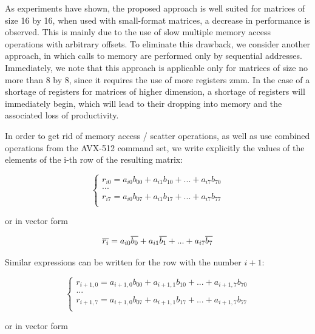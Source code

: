 \documentclass[
11pt,%
tightenlines,%
twoside,%
onecolumn,%
nofloats,%
nobibnotes,%
nofootinbib,%
superscriptaddress,%
noshowpacs,%
centertags]%
{revtex4}
\begin{document}
As experiments have shown, the proposed approach is well suited for matrices of size 16 by 16, when used with small-format matrices, a decrease in performance is observed. This is mainly due to the use of slow multiple memory access operations with arbitrary offsets. To eliminate this drawback, we consider another approach, in which calls to memory are performed only by sequential addresses. Immediately, we note that this approach is applicable only for matrices of size no more than 8 by 8, since it requires the use of more registers zmm. In the case of a shortage of registers for matrices of higher dimension, a shortage of registers will immediately begin, which will lead to their dropping into memory and the associated loss of productivity.

In order to get rid of memory access / scatter operations, as well as use combined operations from the AVX-512 command set, we write explicitly the values of the elements of the i-th row of the resulting matrix:

\begin{equation}
\begin{cases}
r_{i0} = a_{i0}b_{00} + a_{i1}b_{10} + ... + a_{i7}b_{70} \\
... \\
r_{i7} = a_{i0}b_{07} + a_{i1}b_{17} + ... + a_{i7}b_{77} \\
\end{cases}
\end{equation}

or in vector form

\begin{equation}
\overline{r_i} = a_{i0}\overline{b_0} + a_{i1}\overline{b_1} + ... + a_{i7}\overline{b_7} \\
\end{equation}

Similar expressions can be written for the row with the number $i + 1$:

\begin{equation}
\begin{cases}
r_{i+1,0} = a_{i+1,0}b_{00} + a_{i+1,1}b_{10} + ... + a_{i+1,7}b_{70} \\
... \\
r_{i+1,7} = a_{i+1,0}b_{07} + a_{i+1,1}b_{17} + ... + a_{i+1,7}b_{77} \\
\end{cases}
\end{equation}

or in vector form
\end{document}
